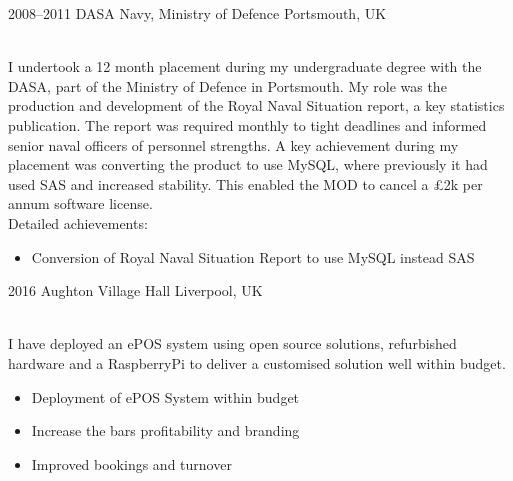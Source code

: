 \documentclass[]{cv-style}          %
\begin{document}
\begin{entrylist}

\entry
  {2008--2011}
  {DASA Navy, Ministry of Defence}
  {Portsmouth, UK}
  {\\
  I undertook a 12 month placement during my undergraduate degree with the DASA, part of the Ministry of Defence in Portsmouth. My role was the production and development of the Royal Naval Situation report, a key statistics publication. The report was required monthly to tight deadlines and informed senior naval officers of personnel strengths. A key achievement during my placement was converting the product to use MySQL, where previously it had used SAS and increased stability. This enabled the MOD to cancel a £2k per annum software license.\\
  Detailed achievements:
  \begin{itemize}
    \item Conversion of Royal Naval Situation Report to use MySQL instead SAS
  \end{itemize}
  }
\end{entrylist}
\begin{entrylist}
\entry
  {2016}
  {Aughton Village Hall}
  {Liverpool, UK}
  {\\{I have deployed an ePOS system using open source solutions, refurbished hardware and a RaspberryPi to deliver a customised solution well within budget.\\}
  \begin{itemize}
    \item Deployment of ePOS System within budget
    \item Increase the bars profitability and branding
    \item Improved bookings and turnover
  \end{itemize}
}
\end{entrylist}




\end{document}
